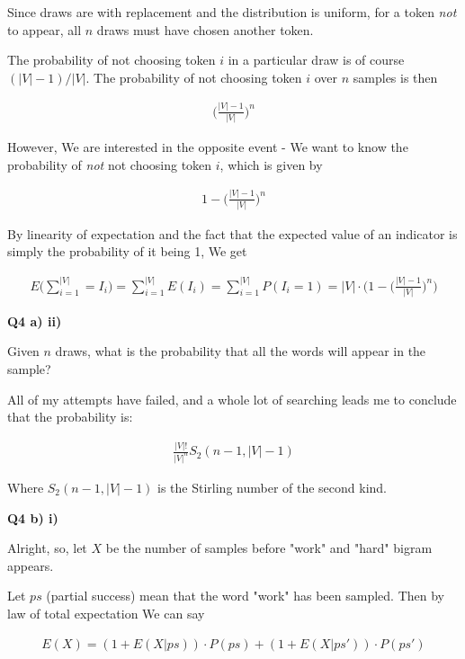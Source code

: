 \documentclass{article}
\begin{document}
	Since draws are with replacement and the distribution is uniform, for a token \textit{not} to appear, all $n$ draws must have chosen another token. 
	
	The probability of not choosing token $i$ in a particular draw is of course $(|V|-1)/|V|$. The probability of not choosing token $i$ over $n$ samples is then
	
	\begin{align}
		\bigg(\frac{|V|-1}{|V|}\bigg)^n
	\end{align}
	
	However, We are interested in the opposite event - We want to know the probability of \textit{not} not choosing token $i$, which is given by
	
	\begin{align}
		1 - \bigg(\frac{|V|-1}{|V|}\bigg)^n
	\end{align}
	
	By linearity of expectation and the fact that the expected value of an indicator is simply the probability of it being 1, We get
	
	\begin{align}
		E\bigg(\sum^{|V|}_{i=1} = I_i \bigg) = \sum^{|V|}_{i=1} E(I_i) =  \sum^{|V|}_{i=1} P(I_i = 1) = |V|\cdot \bigg( 1 - \bigg(\frac{|V|-1}{|V|}\bigg)^n\bigg)
	\end{align}
	
\textbf{Q4 a) ii)}

	Given $n$ draws, what is the probability that all the words will appear in the sample? 
	
	All of my attempts have failed, and a whole lot of searching leads me to conclude that the probability is:
	
	\begin{align}
		\frac{|V|!}{|V|^n}S_2(n-1, |V|-1)
	\end{align}
	
	Where $S_2(n-1, |V|-1)$ is the Stirling number of the second kind. 
	
\textbf{Q4 b) i)}

	Alright, so, let $X$ be the number of samples before "work" and "hard" bigram appears.
	
	Let $ps$ (partial success) mean that the word "work" has been sampled. Then by law of total expectation We can say
	
	\begin{align}
		E(X) = (1+E(X|ps))\cdot P(ps) + (1+E(X|ps'))\cdot P(ps')
	\end{align}
	
\end{document}
